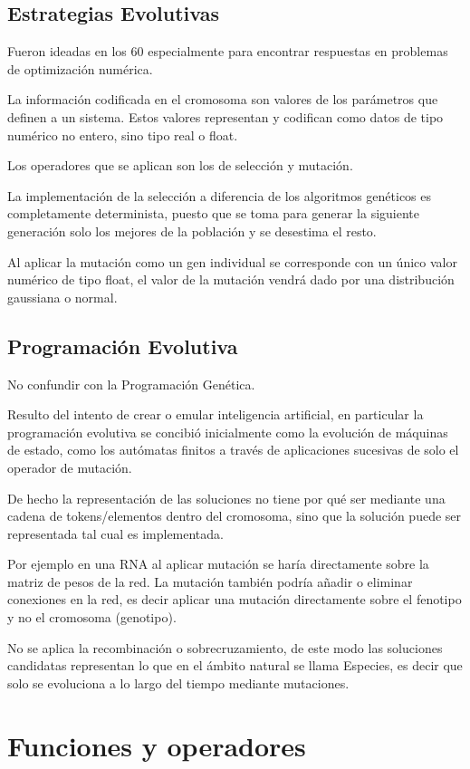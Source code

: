 \documentclass[12pt, twoside, openright]{report} %
\begin{document}
\subsection{Estrategias Evolutivas}
Fueron ideadas en los 60 especialmente para encontrar respuestas en problemas de optimización numérica.

La información codificada en el cromosoma son valores de los parámetros que definen a un sistema. Estos valores representan y codifican como datos de tipo numérico no entero, sino tipo real o float.

Los operadores que se aplican son los de selección y mutación.

La implementación de la selección a diferencia de los algoritmos genéticos es completamente determinista, puesto que se toma para generar la siguiente generación solo los mejores de la población y se desestima el resto.

Al aplicar la mutación como un gen individual se corresponde con un único valor numérico de tipo float, el valor de la mutación vendrá dado por una distribución gaussiana o normal.

\subsection{Programación Evolutiva}
No confundir con la Programación Genética.

Resulto del intento de crear o emular inteligencia artificial, en particular la programación evolutiva se concibió inicialmente como la evolución de máquinas de estado, como los autómatas finitos a través de aplicaciones sucesivas de solo el operador de mutación.

De hecho la representación de las soluciones no tiene por qué ser mediante una cadena de tokens/elementos dentro del cromosoma, sino que la solución puede ser representada tal cual es implementada.

Por ejemplo en una RNA al aplicar mutación se haría directamente sobre la matriz de pesos de la red. La mutación también podría añadir o eliminar conexiones en la red, es decir aplicar una mutación directamente sobre el fenotipo y no el cromosoma (genotipo).

No se aplica la recombinación o sobrecruzamiento, de este modo las soluciones candidatas representan lo que en el ámbito natural se llama Especies, es decir que solo se evoluciona a lo largo del tiempo mediante mutaciones.

\section{Funciones y operadores}
\end{document}
